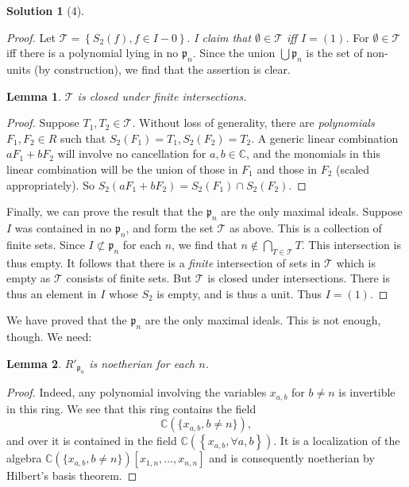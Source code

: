\documentclass{article}
\newtheorem{lemma}{Lemma}
\theoremstyle{definition}
\newtheorem*{solution}{Solution}
\begin{document}
\begin{solution}[4]
\begin{proof}
Let $\mathcal{T} = \left\{ S_2(f), f \in I - 0\right\}$. \emph{I claim that
$\emptyset \in \mathcal{T}$ iff $I = (1)$.} For $\emptyset \in \mathcal{T}$ iff
there is a polynomial lying in no $\mathfrak{p}_n$. Since the union $\bigcup
\mathfrak{p}_n$ is the set of non-units (by construction), we find that the
assertion is clear.


\begin{lemma} 
$\mathcal{T}$ is closed under finite intersections.
\end{lemma} 
\begin{proof} 
Suppose $T_1, T_2 \in \mathcal{T}$. Without loss of generality, there are
\emph{polynomials} $F_1, F_2 \in R$ such that $S_2(F_1) = T_1, S_2(F_2) = T_2$.
A generic linear combination $a F_1 + bF_2$ will involve no cancellation for
$a, b \in \mathbb{C}$, and
the monomials in this linear combination will be the union of those in $F_1$
and those in $F_2$ (scaled appropriately). So $S_2(aF_1 + bF_2) = S_2(F_1) \cap S_2(F_2)$.
\end{proof} 

Finally, we can prove the result that the $\mathfrak{p}_n$ are the only maximal
ideals. Suppose $I$ was contained in no $\mathfrak{p}_n$, and form the set
$\mathcal{T}$ as above. This is a collection of finite sets. Since $I
\not\subset \mathfrak{p}_n$ for each $n$, we find that $n \notin \bigcap_{T \in
\mathcal{T}} T$. This intersection is thus empty. It follows that there is a
\emph{finite} intersection of sets in $\mathcal{T}$
which is empty as $\mathcal{T}$ consists of finite sets. But $\mathcal{T}$ is closed under intersections. There is thus
an element in $I$ whose $S_2$ is empty, and is thus a unit. Thus $I = (1)$.
\end{proof} 

We have proved that the $\mathfrak{p}_n$ are the only maximal ideals. This is
not enough, though. We need:
\begin{lemma} 
$R'_{\mathfrak{p}_n}$ is noetherian for each $n$. 
\end{lemma} 
\begin{proof} 
Indeed, any polynomial involving the variables $x_{a,b}$ for $ b \neq n$ is
invertible in this ring. We see that this ring contains the field
\[ \mathbb{C}(\{x_{a,b}, b \neq n\}),  \]
and over it is contained in the field $\mathbb{C}(\left\{x_{a,b}, \forall
a,b\right\})$. It is a localization of the algebra $\mathbb{C}(\{x_{a,b}, b
\neq n\})[x_{1,n} , \dots, x_{n,n}]$ and is consequently noetherian by
Hilbert's basis theorem.
\end{proof} 


\end{solution}
\end{document}
